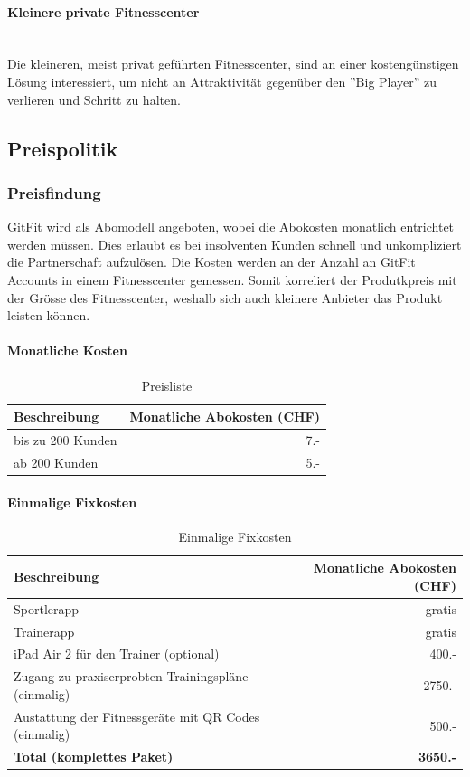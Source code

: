 \paragraph{Kleinere private Fitnesscenter} \hfill \\
Die kleineren, meist privat geführten Fitnesscenter, sind an einer kostengünstigen Lösung interessiert, um nicht an Attraktivität gegenüber den ''Big Player'' zu verlieren und Schritt zu halten. 

\subsection{Preispolitik}
\subsubsection{Preisfindung}
GitFit wird als Abomodell angeboten, wobei die Abokosten monatlich entrichtet werden müssen. Dies erlaubt es bei insolventen Kunden schnell und unkompliziert die Partnerschaft aufzulösen. Die Kosten werden an der Anzahl an GitFit Accounts in einem Fitnesscenter gemessen. Somit korreliert der Produtkpreis mit der Grösse des Fitnesscenter, weshalb sich auch kleinere Anbieter das Produkt leisten können.

\paragraph{Monatliche Kosten} \hfill
\begin{table}[h]
	\centering
	\begin{tabu} to \linewidth {l r}
		\toprule 
		Beschreibung & Monatliche Abokosten (CHF) \\
		\midrule
		bis zu 200 Kunden & 7.- \\
		ab 200 Kunden & 5.- \\
		\bottomrule 
	\end{tabu} 
	\caption{Preisliste}
\end{table}

\paragraph{Einmalige Fixkosten} \hfill
\begin{table}[h]
	\centering
	\begin{tabu} to \linewidth {l r}
		\toprule 
		Beschreibung & Monatliche Abokosten (CHF) \\
		\midrule
		Sportlerapp & gratis \\
		Trainerapp & gratis \\
		iPad Air 2 für den Trainer (optional) & 400.- \\
		Zugang zu praxiserprobten Trainingspläne (einmalig) & 2750.- \\
		Austattung der Fitnessgeräte mit QR Codes (einmalig) & 500.-  \\
		\midrule
		\textbf{Total (komplettes Paket)} & \textbf{3650.-} \\
		\bottomrule 
	\end{tabu} 
	\caption{Einmalige Fixkosten}
\end{table}

